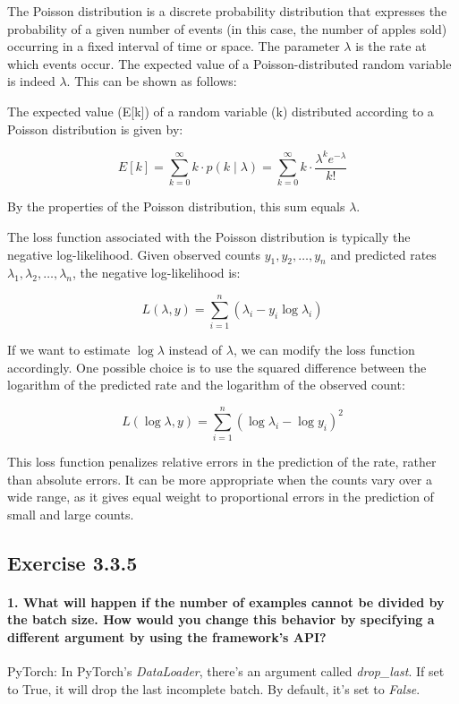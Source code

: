 The Poisson distribution is a discrete probability distribution that expresses the probability of a given number of events (in this case, the number of apples sold) occurring in a fixed interval of time or space.
The parameter \(\lambda\) is the rate at which events occur.
The expected value of a Poisson-distributed random variable is indeed \(\lambda\). This can be shown as follows:

The expected value (E[k]) of a random variable (k) distributed according to a Poisson distribution is given by:

$$E[k] = \sum_{k=0}^{\infty} k \cdot p(k \mid \lambda) = \sum_{k=0}^{\infty} k \cdot \frac{\lambda^k e^{-\lambda}}{k!}$$

By the properties of the Poisson distribution, this sum equals \(\lambda\).

The loss function associated with the Poisson distribution is typically the negative log-likelihood. Given observed counts \(y_1, y_2, \ldots, y_n\) and predicted rates \(\lambda_1, \lambda_2, \ldots, \lambda_n\), the negative log-likelihood is:

$$L(\lambda, y) = \sum_{i=1}^{n} (\lambda_i - y_i \log \lambda_i)$$

If we want to estimate \(\log \lambda\) instead of \(\lambda\), we can modify the loss function accordingly.
One possible choice is to use the squared difference between the logarithm of the predicted rate and the logarithm of the observed count:

$$L(\log \lambda, y) = \sum_{i=1}^{n} (\log \lambda_i - \log y_i)^2$$

This loss function penalizes relative errors in the prediction of the rate, rather than absolute errors. It can be more appropriate when the counts vary over a wide range, as it gives equal weight to proportional errors in the prediction of small and large counts.

\subsection{Exercise 3.3.5}

\paragraph{1. What will happen if the number of examples cannot be divided by the batch size. How would you change this behavior by specifying a different argument by using the framework’s API?}

PyTorch: In PyTorch's \emph{DataLoader}, there's an argument called \emph{drop\_last}.
If set to True, it will drop the last incomplete batch.
By default, it's set to \emph{False}.

